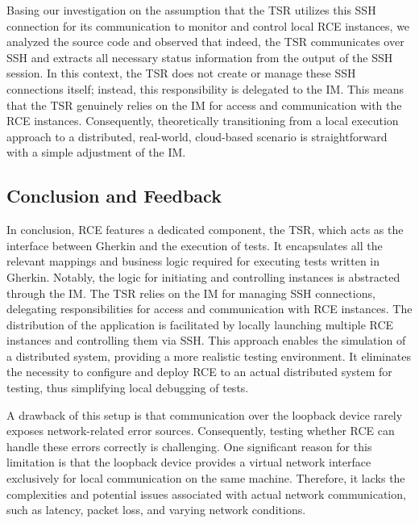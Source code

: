 Basing our investigation on the assumption that the \ac{TSR} utilizes this \ac{SSH} connection for its communication to monitor and control local \ac{RCE} instances, we analyzed the source code and observed that indeed, the \ac{TSR} communicates over \ac{SSH} and extracts all necessary status information from the output of the \ac{SSH} session. In this context, the \ac{TSR} does not create or manage these \ac{SSH} connections itself; instead, this responsibility is delegated to the \ac{IM}. This means that the \ac{TSR} genuinely relies on the \ac{IM} for access and communication with the RCE instances. Consequently, theoretically transitioning from a local execution approach to a distributed, real-world, cloud-based scenario is straightforward with a simple adjustment of the \ac{IM}.

\subsection{Conclusion and Feedback}
In conclusion, RCE features a dedicated component, the \acf{TSR}, which acts as the interface between Gherkin and the execution of tests. It encapsulates all the relevant mappings and business logic required for executing tests written in Gherkin. Notably, the logic for initiating and controlling instances is abstracted through the \acf{IM}. The \ac{TSR} relies on the \ac{IM} for managing \ac{SSH} connections, delegating responsibilities for access and communication with RCE instances. The distribution of the application is facilitated by locally launching multiple RCE instances and controlling them via \ac{SSH}. This approach enables the simulation of a distributed system, providing a more realistic testing environment. It eliminates the necessity to configure and deploy RCE to an actual distributed system for testing, thus simplifying local debugging of tests.

A drawback of this setup is that communication over the loopback device rarely exposes network-related error sources. Consequently, testing whether RCE can handle these errors correctly is challenging. One significant reason for this limitation is that the loopback device provides a virtual network interface exclusively for local communication on the same machine. Therefore, it lacks the complexities and potential issues associated with actual network communication, such as latency, packet loss, and varying network conditions.


